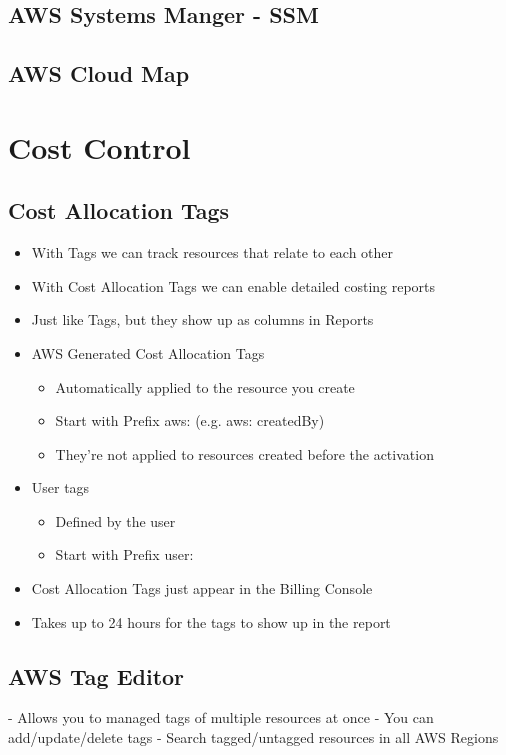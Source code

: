 \documentclass[11pt]{book}
\begin{document}
    \section{AWS Systems Manger - SSM}


    \section{AWS Cloud Map}


    \chapter{Cost Control}


    \section{Cost Allocation Tags}

    \begin{itemize}
        \item With Tags we can track resources that relate to each other
        \item With Cost Allocation Tags we can enable detailed costing reports
        \item Just like Tags, but they show up as columns in Reports
        \item AWS Generated Cost Allocation Tags
        \begin{itemize}
            \item Automatically applied to the resource you create
            \item Start with Prefix aws: (e.g. aws: createdBy)
            \item They're not applied to resources created before the activation
        \end{itemize}
        \item User tags
        \begin{itemize}
            \item Defined by the user
            \item Start with Prefix user:
        \end{itemize}
        \item Cost Allocation Tags just appear in the Billing Console
        \item Takes up to 24 hours for the tags to show up in the report
    \end{itemize}


    \section{AWS Tag Editor}
    - Allows you to managed tags of multiple resources at once
    - You can add/update/delete tags
    - Search tagged/untagged resources in all AWS Regions
\end{document}
